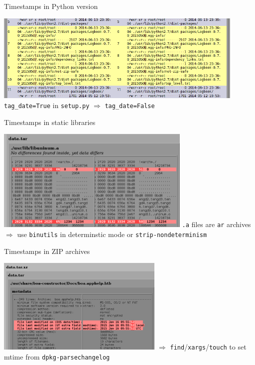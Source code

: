\documentclass[14pt]{beamer}
\begin{document}
\begin{frame}{Timestamps in Python version}
 \begin{center}
  \includegraphics[width=0.9\textwidth]{images/examples/timestamps_in_python_version.png}
  \vfill
  \texttt{tag\_date=True} in \texttt{setup.py} $\Longrightarrow$ \texttt{tag\_date=False}
 \end{center}
\end{frame}

\begin{frame}{Timestamps in static libraries}
 \begin{center}
  \includegraphics[width=0.7\textwidth]{images/examples/timestamps_in_static_library.png}
  \vfill
  \texttt{.a} files are \texttt{ar} archives $\Longrightarrow$ use \texttt{binutils} in determinstic mode or \texttt{strip-nondeterminism}
 \end{center}
\end{frame}

\begin{frame}{Timestamps in ZIP archives}
 \begin{center}
  \includegraphics[width=0.6\textwidth]{images/examples/timestamps_in_zip.png}
  \vfill
  $\Longrightarrow$ \texttt{find}/\texttt{xargs}/\texttt{touch} to set mtime from \texttt{dpkg-parsechangelog}
 \end{center}
\end{frame}
\end{document}
